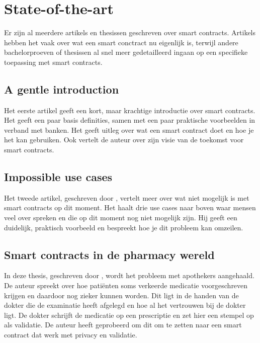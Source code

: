 \documentclass[fleqn,10pt]{voorstel}
\begin{document}

\section{State-of-the-art}
\label{sec:state-of-the-art}


Er zijn al meerdere artikels en thesissen geschreven over smart contracts. Artikels hebben het vaak over wat een smart conctract nu eigenlijk is, terwijl andere bachelorproeven of thesissen al snel meer gedetailleerd ingaan op een specifieke toepassing met smart contracts.

\subsection{A gentle introduction}
Het eerste artikel \autocite{art1} geeft een kort, maar krachtige introductie over smart contracts. Het geeft een paar basis definities, samen met een paar praktische voorbeelden in verband met banken. Het geeft uitleg over wat een smart contract doet en hoe je het kan gebruiken. Ook vertelt de auteur over zijn visie van de toekomst voor smart contracts.

\subsection{Impossible use cases}
Het tweede artikel, geschreven door \textcite{art6}, vertelt meer over wat niet mogelijk is met smart contracts op dit moment. Het haalt drie use cases naar boven waar mensen veel over spreken en die op dit moment nog niet mogelijk zijn. Hij geeft een duidelijk, praktisch voorbeeld en bespreekt hoe je dit probleem kan omzeilen.

\subsection{Smart contracts in de pharmacy wereld}
In deze thesis, geschreven door \textcite{the1}, wordt het probleem met apothekers aangehaald. De auteur spreekt over hoe patiënten soms verkeerde medicatie voorgeschreven krijgen en daardoor nog zieker kunnen worden. Dit ligt in de handen van de dokter die de examinatie heeft afgelegd en hoe al het vertrouwen bij de dokter ligt. De dokter schrijft de medicatie op een prescriptie en zet hier een stempel op als validatie. De auteur heeft geprobeerd om dit om te zetten naar een smart contract dat werk met privacy en validatie.
\end{document}
